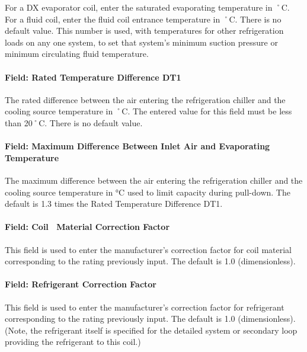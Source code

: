 For a DX evaporator coil, enter the saturated evaporating temperature in ˚C.~ For a fluid coil, enter the fluid coil entrance temperature in ˚C. There is no default value. This number is used, with temperatures for other refrigeration loads on any one system, to set that system's minimum suction pressure or minimum circulating fluid temperature.

\paragraph{Field: Rated Temperature Difference DT1}\label{field-rated-temperature-difference-dt1}

The rated difference between the air entering the refrigeration chiller and the cooling source temperature in ˚C. The entered value for this field must be less than 20˚C. There is no default value.

\paragraph{Field: Maximum Difference Between Inlet Air and Evaporating Temperature}\label{field-maximum-difference-between-inlet-air-and-evaporating-temperature}

The maximum difference between the air entering the refrigeration chiller and the cooling source temperature in °C used to limit capacity during pull-down. The default is 1.3 times the Rated Temperature Difference DT1.

\paragraph{Field: Coil~ Material Correction Factor}\label{field-coil-material-correction-factor}

This field is used to enter the manufacturer's correction factor for coil material corresponding to the rating previously input. The default is 1.0 (dimensionless).

\paragraph{Field: Refrigerant Correction Factor}\label{field-refrigerant-correction-factor}

This field is used to enter the manufacturer's correction factor for refrigerant corresponding to the rating previously input. The default is 1.0 (dimensionless). (Note, the refrigerant itself is specified for the detailed system or secondary loop providing the refrigerant to this coil.)

